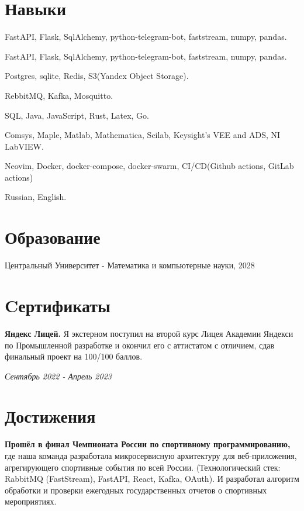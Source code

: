 \documentclass[margin,line]{resume}
\begin{document}
\begin{resume}
  \section{\mysidestyle Навыки}
  \begin{description}[leftmargin=0pt, itemindent=*]
    \item[Python:] FastAPI, Flask, SqlAlchemy, python-telegram-bot,
      faststream, numpy, pandas.
    \item[Go] FastAPI, Flask, SqlAlchemy, python-telegram-bot,
      faststream, numpy, pandas.
    \item[Databases] Postgres, sqlite, Redis, S3(Yandex Object Storage).
    \item[Message brokers:] RebbitMQ, Kafka, Mosquitto.
    \item[Other techonologies:] SQL, Java, JavaScript, Rust, Latex, Go.
    \item[Scientific softwares] Comsys, Maple, Matlab, Mathematica,
      Scilab, Keysight's VEE and ADS, NI LabVIEW.
    \item[Dev tools:] Neovim, Docker, docker-compose, docker-swarm,
      CI/CD(Github actions, GitLab actions)
    \item[Languages:] Russian, English.
  \end{description}

  \section{\mysidestyle Образование}
  Центральный Университет - Математика и компьютерные науки, 2028

  \section{\mysidestyle Cертификаты}
  \textbf{Яндекс Лицей.} Я экстерном поступил на второй курс Лицея
  Академии Яндекси по Промышленной разработке и окончил его с
  аттистатом с отличием, сдав финальный проект на 100/100 баллов.
  \vspace{-6mm}

  \hfill \textsl{Сентябрь 2022 - Апрель 2023}

  \section{\mysidestyle Достижения}
  \textbf{Прошёл в финал Чемпионата России по спортивному
  программированию,} где наша команда разработала микросервисную
  архитектуру для веб-приложения, агрегирующего спортивные события по
  всей России. (Технологический стек: RabbitMQ (FastStream), FastAPI,
  React, Kafka, OAuth). И разработал алгоритм обработки и проверки
  ежегодных государственных отчетов о спортивных мероприятиях.


\end{resume}
\end{document}
